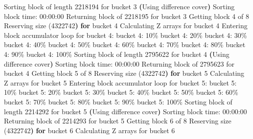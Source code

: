 \documentclass[
  letterpaper,
  DIV=11,
  numbers=noendperiod]{scrartcl}
\newenvironment{Shaded}{\begin{snugshade}}{\end{snugshade}}
\newcommand{\ControlFlowTok}[1]{\textcolor[rgb]{0.00,0.23,0.31}{\textbf{#1}}}
\newcommand{\ErrorTok}[1]{\textcolor[rgb]{0.68,0.00,0.00}{#1}}
\newcommand{\ExtensionTok}[1]{\textcolor[rgb]{0.00,0.23,0.31}{#1}}
\newcommand{\KeywordTok}[1]{\textcolor[rgb]{0.00,0.23,0.31}{\textbf{#1}}}
\newcommand{\NormalTok}[1]{\textcolor[rgb]{0.00,0.23,0.31}{#1}}
\begin{document}
\begin{Shaded}
\begin{Highlighting}[]
  \ExtensionTok{Sorting}\NormalTok{ block of length 2218194 for bucket 3}
  \KeywordTok{(}\ExtensionTok{Using}\NormalTok{ difference cover}\KeywordTok{)}
  \ExtensionTok{Sorting}\NormalTok{ block time: 00:00:00}
\ExtensionTok{Returning}\NormalTok{ block of 2218195 for bucket 3}
\ExtensionTok{Getting}\NormalTok{ block 4 of 8}
  \ExtensionTok{Reserving}\NormalTok{ size }\ErrorTok{(}\ExtensionTok{4322742}\KeywordTok{)} \ControlFlowTok{for}\NormalTok{ bucket }\ExtensionTok{4}
  \ExtensionTok{Calculating}\NormalTok{ Z arrays for bucket 4}
  \ExtensionTok{Entering}\NormalTok{ block accumulator loop for bucket 4:}
  \ExtensionTok{bucket}\NormalTok{ 4: 10\%}
  \ExtensionTok{bucket}\NormalTok{ 4: 20\%}
  \ExtensionTok{bucket}\NormalTok{ 4: 30\%}
  \ExtensionTok{bucket}\NormalTok{ 4: 40\%}
  \ExtensionTok{bucket}\NormalTok{ 4: 50\%}
  \ExtensionTok{bucket}\NormalTok{ 4: 60\%}
  \ExtensionTok{bucket}\NormalTok{ 4: 70\%}
  \ExtensionTok{bucket}\NormalTok{ 4: 80\%}
  \ExtensionTok{bucket}\NormalTok{ 4: 90\%}
  \ExtensionTok{bucket}\NormalTok{ 4: 100\%}
  \ExtensionTok{Sorting}\NormalTok{ block of length 2795622 for bucket 4}
  \KeywordTok{(}\ExtensionTok{Using}\NormalTok{ difference cover}\KeywordTok{)}
  \ExtensionTok{Sorting}\NormalTok{ block time: 00:00:00}
\ExtensionTok{Returning}\NormalTok{ block of 2795623 for bucket 4}
\ExtensionTok{Getting}\NormalTok{ block 5 of 8}
  \ExtensionTok{Reserving}\NormalTok{ size }\ErrorTok{(}\ExtensionTok{4322742}\KeywordTok{)} \ControlFlowTok{for}\NormalTok{ bucket }\ExtensionTok{5}
  \ExtensionTok{Calculating}\NormalTok{ Z arrays for bucket 5}
  \ExtensionTok{Entering}\NormalTok{ block accumulator loop for bucket 5:}
  \ExtensionTok{bucket}\NormalTok{ 5: 10\%}
  \ExtensionTok{bucket}\NormalTok{ 5: 20\%}
  \ExtensionTok{bucket}\NormalTok{ 5: 30\%}
  \ExtensionTok{bucket}\NormalTok{ 5: 40\%}
  \ExtensionTok{bucket}\NormalTok{ 5: 50\%}
  \ExtensionTok{bucket}\NormalTok{ 5: 60\%}
  \ExtensionTok{bucket}\NormalTok{ 5: 70\%}
  \ExtensionTok{bucket}\NormalTok{ 5: 80\%}
  \ExtensionTok{bucket}\NormalTok{ 5: 90\%}
  \ExtensionTok{bucket}\NormalTok{ 5: 100\%}
  \ExtensionTok{Sorting}\NormalTok{ block of length 2214292 for bucket 5}
  \KeywordTok{(}\ExtensionTok{Using}\NormalTok{ difference cover}\KeywordTok{)}
  \ExtensionTok{Sorting}\NormalTok{ block time: 00:00:00}
\ExtensionTok{Returning}\NormalTok{ block of 2214293 for bucket 5}
\ExtensionTok{Getting}\NormalTok{ block 6 of 8}
  \ExtensionTok{Reserving}\NormalTok{ size }\ErrorTok{(}\ExtensionTok{4322742}\KeywordTok{)} \ControlFlowTok{for}\NormalTok{ bucket }\ExtensionTok{6}
  \ExtensionTok{Calculating}\NormalTok{ Z arrays for bucket 6}

\end{Highlighting}
\end{Shaded}
\end{document}
